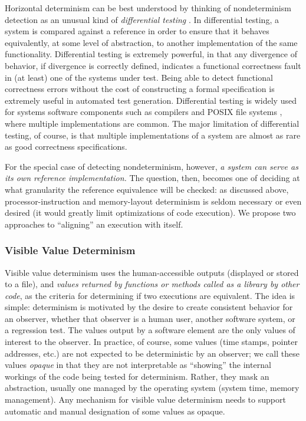 Horizontal determinism can be best understood by thinking of
nondeterminism detection as an unusual kind of \emph{differential
  testing} \cite{Differential,ICSEDiff}.  In differential testing, a
system is compared against a reference in order to ensure that
it behaves equivalently, at some level of abstraction, to another
implementation of the same functionality.  Differential testing is
extremely powerful, in that any divergence of behavior, if divergence
is correctly defined, indicates a functional correctness fault in (at
least) one of the systems under test.  Being able to detect functional
correctness errors without the cost of constructing a formal
specification is extremely useful in automated test generation.  Differential testing is widely
used for systems software components such as compilers
\cite{Differential,csmith} and POSIX file systems \cite{CFV08,AMAI}, where multiple
implementations are common.  The major limitation of differential
testing, of course, is that multiple implementations of a system are
almost as rare as good correctness specifications.

For the special case of detecting nondeterminism, however, \emph{a
  system can serve as its own reference implementation.}    The
question, then, becomes one of deciding at what granularity the
reference equivalence will be checked:  as discussed above,
processor-instruction and memory-layout determinism is seldom
necessary or even desired (it would greatly limit optimizations of
code execution).  We propose two approaches to ``aligning'' an
execution with itself.

\subsubsection{Visible Value Determinism}

Visible value determinism uses the human-accessible outputs (displayed
or stored to a file), and \emph{values returned by functions or methods
called as a library by other code}, as the criteria for determining if two executions
are equivalent.  The idea is simple:  determinism is motivated by the
desire to create consistent behavior for an observer, whether that
observer is a human user, another software system, or a regression
test.  The values output by a software element are the only values of
interest to the observer.  In practice, of course, some values (time
stamps, pointer addresses, etc.) are not expected to be deterministic
by an observer; we call these values \emph{opaque} in that they are
not interpretable as ``showing'' the internal workings of the code
being tested for determinism.  Rather, they mask an abstraction,
usually one managed by the operating system (system
time, memory management).   Any mechanism for visible value
determinism needs to support automatic and manual designation of some
values as opaque.

